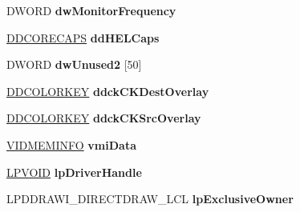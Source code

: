 \begin{DoxyCompactItemize}
D\+W\+O\+RD {\bfseries dw\+Monitor\+Frequency}
\item 
\mbox{\label{struct___d_d_r_a_w_i___d_i_r_e_c_t_d_r_a_w___g_b_l_ababf2c659c56a668f947e683039705fd}} 
\hyperlink{struct___d_d_c_o_r_e_c_a_p_s}{D\+D\+C\+O\+R\+E\+C\+A\+PS} {\bfseries dd\+H\+E\+L\+Caps}
\item 
\mbox{\label{struct___d_d_r_a_w_i___d_i_r_e_c_t_d_r_a_w___g_b_l_a38cb65d9591443649f2bbcb423b46679}} 
D\+W\+O\+RD {\bfseries dw\+Unused2} \mbox{[}50\mbox{]}
\item 
\mbox{\label{struct___d_d_r_a_w_i___d_i_r_e_c_t_d_r_a_w___g_b_l_a182811776b3a6e1afae3f747c90286cd}} 
\hyperlink{struct_d_d_c_o_l_o_r_k_e_y}{D\+D\+C\+O\+L\+O\+R\+K\+EY} {\bfseries ddck\+C\+K\+Dest\+Overlay}
\item 
\mbox{\label{struct___d_d_r_a_w_i___d_i_r_e_c_t_d_r_a_w___g_b_l_abadfb899c57d5da0fb77f3a35145723f}} 
\hyperlink{struct_d_d_c_o_l_o_r_k_e_y}{D\+D\+C\+O\+L\+O\+R\+K\+EY} {\bfseries ddck\+C\+K\+Src\+Overlay}
\item 
\mbox{\label{struct___d_d_r_a_w_i___d_i_r_e_c_t_d_r_a_w___g_b_l_a88e3cddd703c24cc175cead8daa2ee89}} 
\hyperlink{struct___v_i_d_m_e_m_i_n_f_o}{V\+I\+D\+M\+E\+M\+I\+N\+FO} {\bfseries vmi\+Data}
\item 
\mbox{\label{struct___d_d_r_a_w_i___d_i_r_e_c_t_d_r_a_w___g_b_l_a684f8ed3eb2ad9f94a41996aa50d3fbb}} 
\hyperlink{interfacevoid}{L\+P\+V\+O\+ID} {\bfseries lp\+Driver\+Handle}
\item 
\mbox{\label{struct___d_d_r_a_w_i___d_i_r_e_c_t_d_r_a_w___g_b_l_a47f318a9ede02ad7ee025f9f3403f6c8}} 
L\+P\+D\+D\+R\+A\+W\+I\+\_\+\+D\+I\+R\+E\+C\+T\+D\+R\+A\+W\+\_\+\+L\+CL {\bfseries lp\+Exclusive\+Owner}
\item 
\mbox{\label{struct___d_d_r_a_w_i___d_i_r_e_c_t_d_r_a_w___g_b_l_ad7e7382b0e5c2855205b476db30d8792}} 

\end{DoxyCompactItemize}
